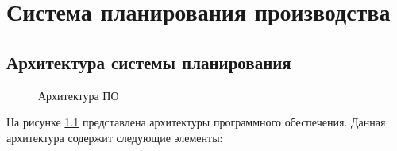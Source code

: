 \chapter{Система планирования производства}

\section{Архитектура системы планирования}

\begin{figure}[H]
    \caption{Архитектура ПО}
    \label{ris:arh1}
\end{figure}

На рисунке \ref{ris:arh1} представлена архитектуры программного обеспечения. Данная архитектура содержит следующие элементы:

